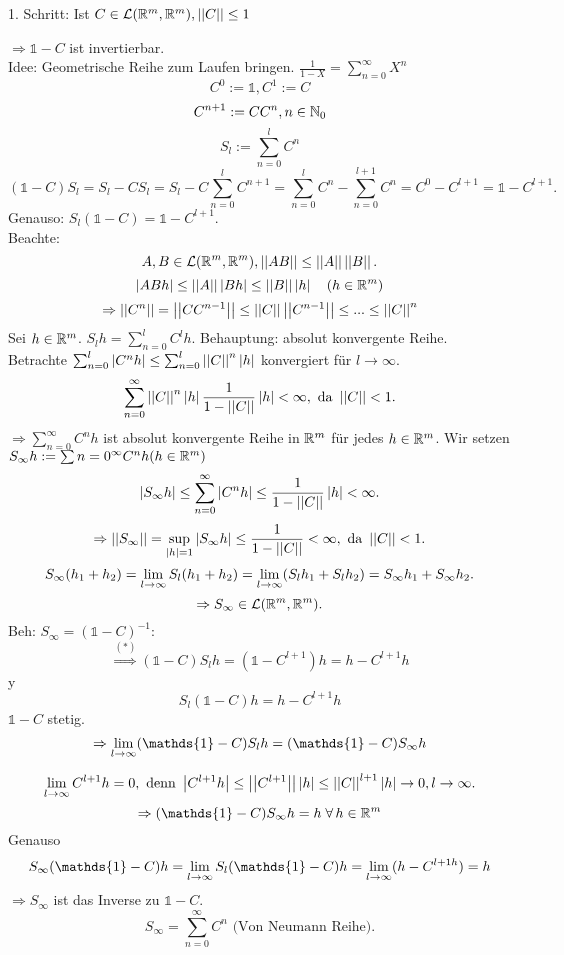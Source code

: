 \documentclass[../ana2.tex]{subfiles}
\begin{document}
\begin{bew}
    1. Schritt: Ist \(C \in \mathcal{L}(\mathbb{R}^m, \mathbb{R}^m), \left|\left|C\right|\right| \leq 1\)

    \( \Rightarrow \mathds{1} - C \) ist invertierbar.\\
    Idee: Geometrische Reihe zum Laufen bringen. \( \frac{1}{1-X} = \sum_{n=0}^\infty X^n \)
    \[ C^0 := \mathds{1}, C^1 := C\]
    \[ C^{n+1} := C C^n, n \in \mathbb{N}_0 \]
    \[ S_l := \sum_{n=0}^l C^n \]
    \[ (\mathds{1} - C)S_l = S_l - C S_l 
    = S_l - C \sum_{n=0}^l C^{n+1} 
    = \sum_{n=0}^l C^{n} - \sum_{n=0}^{l+1} C^n
    = C^0 - C^{l+1} = \mathds{1} - C^{l+1}. \tag{\(*\)}\]
    Genauso: \( S_l(\mathds{1} - C) = \mathds{1} - C^{l+1} \).\\
    Beachte: \[A, B \in \mathcal{L}(\mathbb{R}^m, \mathbb{R}^m), 
    \left|\left|A B\right|\right| \leq \left|\left|A\right|\right| \left|\left|B\right|\right|. \]
    \[\left|ABh\right| \leq \left|\left|A\right|\right| \left|Bh\right| \leq \left|\left|B\right|\right| \left|h\right| \quad (h \in \mathbb{R}^m) \]
    \[\Rightarrow \left|\left|C^n\right|\right| = \left|\left|C C^{n-1}\right|\right| \leq \left|\left|C\right|\right| \left|\left|C^{n-1}\right|\right|
    \leq ... \leq \left|\left|C\right|\right|^n\]
    Sei \(h \in \mathbb{R}^m\). \( S_l h = \sum_{n=0}^l C^l h \).
    Behauptung: absolut konvergente Reihe.\\
    Betrachte \( \sum_{n=0}^l \left| C^n h \right| 
    \leq \sum_{n=0}^l \left|\left|C\right|\right|^n \left|h\right| \) konvergiert für \( l \rightarrow \infty \).
    \[ \sum_{n=0}^\infty \left|\left|C\right|\right|^n \left|h\right| \frac{1}{1 - \left|\left|C\right|\right|} \left|h\right| < \infty, 
    \text{ da } \left|\left|C\right|\right| < 1. \]
    \( \Rightarrow \sum_{n=0}^\infty C^n h \) ist absolut konvergente Reihe in
    \( \mathbb{R}^m \) für jedes \( h \in \mathbb{R}^m \).
    Wir setzen \( S_\infty h := \sum{n=0}^\infty C^n h (h \in \mathbb{R}^m)\)
    \[ \left| S_\infty h \right| \leq \sum_{n=0}^\infty \left| C^n h \right| 
    \leq \frac{1}{1 - \left|\left|C\right|\right|}\left|h\right| < \infty. \]
    \[ \Rightarrow \left|\left|S_\infty\right|\right| = \underset{\left|h\right| = 1}{\sup} 
    \left| S_\infty h \right| \leq \frac{1}{1 - \left|\left|C\right|\right|} < \infty, 
    \text{ da } \left|\left|C\right|\right| < 1. \]
    \[ S_\infty(h_1 + h_2) 
    = \lim\limits_{l\rightarrow\infty} S_l(h_1 + h_2) 
    = \lim\limits_{l\rightarrow\infty} (S_l h_1 + S_l h_2)
    = S_\infty h_1 + S_\infty h_2. \]
    \[ \Rightarrow S_\infty \in \mathcal{L}(\mathbb{R}^m, \mathbb{R}^m). \]
    Beh: \( S_\infty = (\mathds{1} -C)^{-1} \): 
    \[ \overset{(*)}{\Rightarrow}  ( \mathds{1} - C)S_l h = (\mathds{1} - C^{l+1})h 
    = h - C^{l+1}h \]y
    \[ S_l (\mathds{1} - C) h = h - C^{l+1}h \]
    \( \mathds{1} - C \) stetig.
    \[\Rightarrow \limes{l} (\mathds{1}-C) S_lh = (\mathds{1}-C) S_\infty h\]

    \[ \lim\limits_{l\rightarrow\infty} C^{l+1} h = 0, \text{ denn } \left|C^{l+1}h\right| \leq \left|\left|C^{l+1}\right|\right| 
    \left|h\right| \leq \left|\left|C\right|\right|^{l+1} \left|h\right| \rightarrow 0, l \rightarrow \infty. \]
    \[ \Rightarrow (\mathds{1} - C) S_\infty h = h \;\forall h \in \R^m \]
    Genauso \[S_\infty(\mathds{1}-C)h = \limes{l} S_l(\mathds{1}-C)h 
    = \limes{l}(h-C^{l+1 h}) = h\]
    \( \Rightarrow S_\infty \) ist das Inverse zu \( \mathds{1} - C \). 
    \[ S_\infty = \sum_{n=0}^\infty C^n \text{ (Von Neumann Reihe)}. \]
    

\end{bew}
\end{document}
